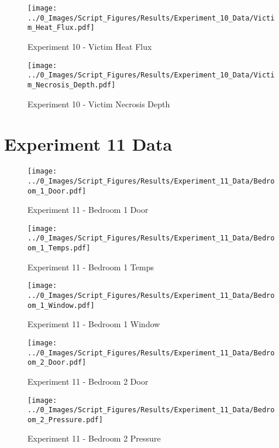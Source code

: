 	\begin{figure}[H]
		\centering
		\texttt{[image: ../0\_Images/Script\_Figures/Results/Experiment\_10\_Data/Victim\_Heat\_Flux.pdf]}
		\caption[]{Experiment 10 - Victim Heat Flux}
	\end{figure}
 
	\clearpage

	\begin{figure}[H]
		\centering
		\texttt{[image: ../0\_Images/Script\_Figures/Results/Experiment\_10\_Data/Victim\_Necrosis\_Depth.pdf]}
		\caption[]{Experiment 10 - Victim Necrosis Depth}
	\end{figure}
 

\clearpage		\large
\section{Experiment 11 Data} \label{App:Exp11Results} 

	\begin{figure}[H]
		\centering
		\texttt{[image: ../0\_Images/Script\_Figures/Results/Experiment\_11\_Data/Bedroom\_1\_Door.pdf]}
		\caption[]{Experiment 11 - Bedroom 1 Door}
	\end{figure}
 

	\begin{figure}[H]
		\centering
		\texttt{[image: ../0\_Images/Script\_Figures/Results/Experiment\_11\_Data/Bedroom\_1\_Temps.pdf]}
		\caption[]{Experiment 11 - Bedroom 1 Temps}
	\end{figure}
 
	\clearpage

	\begin{figure}[H]
		\centering
		\texttt{[image: ../0\_Images/Script\_Figures/Results/Experiment\_11\_Data/Bedroom\_1\_Window.pdf]}
		\caption[]{Experiment 11 - Bedroom 1 Window}
	\end{figure}
 

	\begin{figure}[H]
		\centering
		\texttt{[image: ../0\_Images/Script\_Figures/Results/Experiment\_11\_Data/Bedroom\_2\_Door.pdf]}
		\caption[]{Experiment 11 - Bedroom 2 Door}
	\end{figure}
 
	\clearpage

	\begin{figure}[H]
		\centering
		\texttt{[image: ../0\_Images/Script\_Figures/Results/Experiment\_11\_Data/Bedroom\_2\_Pressure.pdf]}
		\caption[]{Experiment 11 - Bedroom 2 Pressure}
	\end{figure}
 

